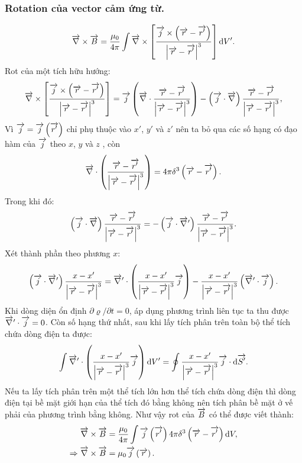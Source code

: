 \begin{appendices}
\subsubsection{Rotation của vector cảm ứng từ.}
    $$\overrightarrow{\nabla}\times\overrightarrow{B}=\dfrac{\mu_0}{4\pi}\int\overrightarrow{\nabla}\times\left[\dfrac{\overrightarrow{j}\times\left(\overrightarrow{r}-\overrightarrow{r'}\right)}{\left|\overrightarrow{r}-\overrightarrow{r'}\right|^3}\right]\mathrm{d} V'.$$
    Rot của một tích hữu hướng:
    \begin{align*}
    \overrightarrow{\nabla}\times\left[\dfrac{\overrightarrow{j}\times\left(\overrightarrow{r}-\overrightarrow{r'}\right)}{\left|\overrightarrow{r}-\overrightarrow{r'}\right|^3}\right]=\overrightarrow{j}\left(\overrightarrow{\nabla}\cdot\dfrac{\overrightarrow{r}-\overrightarrow{r'}}{\left|\overrightarrow{r}-\overrightarrow{r'}\right|^3}\right)-
    \left(\overrightarrow{j}\cdot\overrightarrow{\nabla}\right)\dfrac{\overrightarrow{r}-\overrightarrow{r'}}{\left|\overrightarrow{r}-\overrightarrow{r'}\right|^3},
    \end{align*}
    Vì $\overrightarrow{j}=\overrightarrow{j}\left(\overrightarrow{r'}\right)$ chỉ phụ thuộc vào $x'$, $y'$ và $z'$ nên ta bỏ qua các số hạng có đạo hàm của $\overrightarrow{j}$ theo $x$, $y$ và $z$ , còn $$\overrightarrow{\nabla}\cdot\left(\dfrac{\overrightarrow{r}-\overrightarrow{r'}}{\left|\overrightarrow{r}-\overrightarrow{r'}\right|^3}\right)=4\pi\delta^3\left(\overrightarrow{r}-\overrightarrow{r'}\right).$$
    Trong khi đó:
    \begin{align*}
    \left(\overrightarrow{j}\cdot\overrightarrow{\nabla}\right)\dfrac{\overrightarrow{r}-\overrightarrow{r'}}{\left|\overrightarrow{r}-\overrightarrow{r'}\right|^3}=-\left(\overrightarrow{j}\cdot\overrightarrow{\nabla}'\right)\dfrac{\overrightarrow{r}-\overrightarrow{r'}}{\left|\overrightarrow{r}-\overrightarrow{r'}\right|^3}.   
    \end{align*}
    Xét thành phần theo phương $x$:
    \begin{align*}
    \left(\overrightarrow{j}\cdot\overrightarrow{\nabla}'\right)\dfrac{x-x'}{\left|\overrightarrow{r}-\overrightarrow{r'}\right|^3} = \overrightarrow{\nabla}'\cdot\left(\dfrac{x-x'}{\left|\overrightarrow{r}-\overrightarrow{r'}\right|^3}\overrightarrow{j}\right)-\dfrac{x-x'}{\left|\overrightarrow{r}-\overrightarrow{r'}\right|^3}\left(\overrightarrow{\nabla}'\cdot\overrightarrow{j}\right).
    \end{align*}
    Khi dòng diện ổn định $\partial \varrho/\partial t=0$, áp dụng phương trình liên tục ta thu được $\overrightarrow{\nabla}'\cdot\overrightarrow{j}=0$.
    Còn số hạng thứ nhất, sau khi lấy tích phân trên toàn bộ thể tích chứa dòng điện ta được:
    \begin{align*}
        \int \overrightarrow{\nabla}'\cdot\left(\dfrac{x-x'}{\left|\overrightarrow{r}-\overrightarrow{r'}\right|^3}\overrightarrow{j}\right)\mathrm{d} V'=\oint \dfrac{x-x'}{\left|\overrightarrow{r}-\overrightarrow{r'}\right|^3}\overrightarrow{j}\cdot\mathrm{d} \overrightarrow{S'}.
    \end{align*}
    Nếu ta lấy tích phân trên một thể tích lớn hơn thể tích chứa dòng điện thì dòng điện tại bề mặt giới hạn của thể tích đó bằng không nên tích phân bề mặt ở vế phải của phương trình bằng không. Như vậy rot của $\overrightarrow{B}$ có thể được viết thành:
    \begin{align*}
     \overrightarrow{\nabla}\times\overrightarrow{B}&=\dfrac{\mu_0}{4\pi}\int\overrightarrow{j}\left(\overrightarrow{r'}\right)4\pi\delta^3\left(\overrightarrow{r}-\overrightarrow{r'}\right)\mathrm{d} V,\\
     \Rightarrow\overrightarrow{\nabla}\times\overrightarrow{B} &=\mu_0\overrightarrow{j}\left(\overrightarrow{r}\right).
    \end{align*}

\end{appendices}
